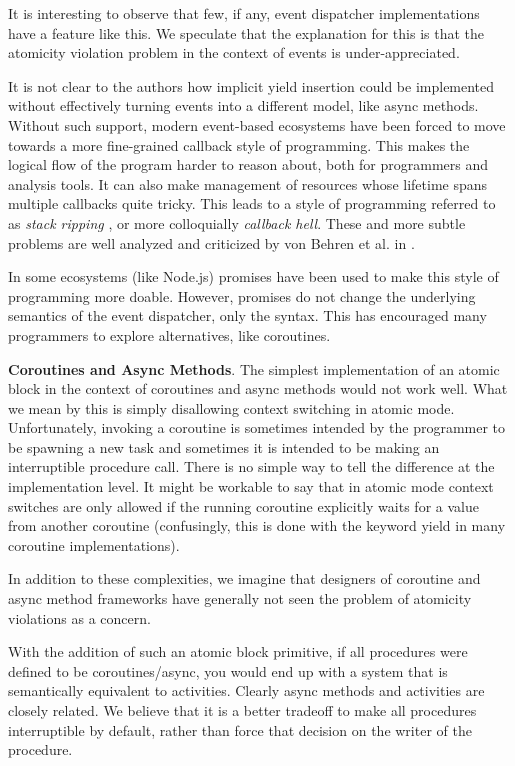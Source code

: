 \documentclass[9pt,preprint]{sigplanconf}
\begin{document}
It is interesting to observe that few, if any, event dispatcher implementations have a feature like this.
We speculate that the explanation for this is that the atomicity violation problem in the context of events is under-appreciated.

It is not clear to the authors how implicit yield insertion could be implemented without effectively turning events into a different model, like async methods.
Without such support, modern event-based ecosystems have been forced to move towards a more fine-grained callback style of programming.
This makes the logical flow of the program harder to reason about, both for programmers and analysis tools.
It can also make management of resources whose lifetime spans multiple callbacks quite tricky.
This leads to a style of programming referred to as \emph{stack ripping} \cite{Adya2002}, or more colloquially \emph{callback hell}.
These and more subtle problems are well analyzed and criticized by von Behren et al. in \cite{Behren2003a}.

In some ecosystems (like Node.js) promises have been used to make this style of programming more doable.
However, promises do not change the underlying semantics of the event dispatcher, only the syntax.
This has encouraged many programmers to explore alternatives, like coroutines.

\textbf{Coroutines and Async Methods}.
The simplest implementation of an atomic block in the context of coroutines and async methods would not work well.
What we mean by this is simply disallowing context switching in atomic mode.
Unfortunately, invoking a coroutine is sometimes intended by the programmer to be spawning a new task and sometimes it is intended to be making an interruptible procedure call.
There is no simple way to tell the difference at the implementation level.
It might be workable to say that in atomic mode context switches are only allowed if the running coroutine explicitly waits for a value from another coroutine (confusingly, this is done with the keyword yield in many coroutine implementations).

In addition to these complexities, we imagine that designers of coroutine and async method frameworks have generally not seen the problem of atomicity violations as a concern.

With the addition of such an atomic block primitive, if all procedures were defined to be coroutines/async, you would end up with a system that is semantically equivalent to activities.
Clearly async methods and activities are closely related.
We believe that it is a better tradeoff to make all procedures interruptible by default, rather than force that decision on the writer of the procedure.
\end{document}
